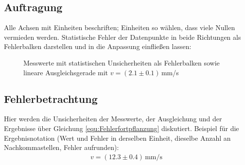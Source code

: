 \subsection{Auftragung}
\label{cap:Auftragung}
Alle Achsen mit Einheiten beschriften; Einheiten so wählen, dass viele Nullen vermieden werden. Statistische Fehler der Datenpunkte in beide Richtungen als Fehlerbalken darstellen und in die Anpassung einfließen lassen:
\begin{figure}[H]
    \centering
    \caption{Messwerte mit statistischen Unsicherheiten als Fehlerbalken sowie lineare Ausgleichsgerade mit $v=(2.1\pm0.1)$\,mm/s}
    \label{fig:Fit}
\end{figure}

\subsection{Fehlerbetrachtung}
\label{cap:Fehlerbetrachtung}
Hier werden die Unsicherheiten der Messwerte, der Ausgleichung und der Ergebnisse über Gleichung \eqref{equ:Fehlerfortpflanzung} diskutiert. Beispiel für die Ergebnisnotation (Wert und Fehler in derselben Einheit, dieselbe Anzahl an Nachkommastellen, Fehler aufrunden):
\begin{align}
    v = (12.3 \pm 0.4)\,\mathrm{mm/s}
    \label{equ:Ergebnis}
\end{align}
